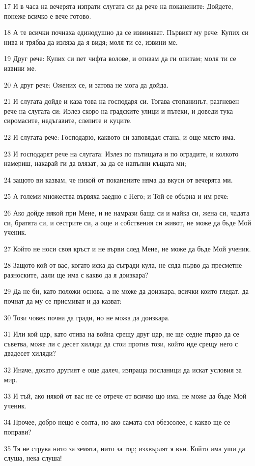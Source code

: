 \par 17 И в часа на вечерята изпрати слугата си да рече на поканените: Дойдете, понеже всичко е вече готово.
\par 18 А те всички почнаха единодушно да се извиняват. Първият му рече: Купих си нива и трябва да изляза да я видя; моля ти се, извини ме.
\par 19 Друг рече: Купих си пет чифта волове, и отивам да ги опитам; моля ти се извини ме.
\par 20 А друг рече: Ожених се, и затова не мога да дойда.
\par 21 И слугата дойде и каза това на господаря си. Тогава стопанинът, разгневен рече на слугата си: Излез скоро на градските улици и пътеки, и доведи тука сиромасите, недъгавите, слепите и куците.
\par 22 И слугата рече: Господарю, каквото си заповядал стана, и още място има.
\par 23 И господарят рече на слугата: Излез по пътищата и по оградите, и колкото намериш, накарай ги да влязат, за да се напълни къщата ми;
\par 24 защото ви казвам, че никой от поканените няма да вкуси от вечерята ми.
\par 25 А големи множества вървяха заедно с Него; и Той се обърна и им рече:
\par 26 Ако дойде някой при Мене, и не намрази баща си и майка си, жена си, чадата си, братята си, и сестрите си, а още и собствения си живот, не може да бъде Мой ученик.
\par 27 Който не носи своя кръст и не върви след Мене, не може да бъде Мой ученик.
\par 28 Защото кой от вас, когато иска да съгради кула, не сяда първо да пресметне разноските, дали ще има с какво да я доизкара?
\par 29 Да не би, като положи основа, а не може да доизкара, всички които гледат, да почнат да му се присмиват и да казват:
\par 30 Този човек почна да гради, но не можа да доизкара.
\par 31 Или кой цар, като отива на война срещу друг цар, не ще седне първо да се съветва, може ли с десет хиляди да стои против този, който иде срещу него с двадесет хиляди?
\par 32 Иначе, докато другият е още далеч, изпраща посланици да искат условия за мир.
\par 33 И тъй, ако някой от вас не се отрече от всичко що има, не може да бъде Мой ученик.
\par 34 Прочее, добро нещо е солта, но ако самата сол обезсолее, с какво ще се поправи?
\par 35 Тя не струва нито за земята, нито за тор; изхвърлят я вън. Който има уши да слуша, нека слуша!

